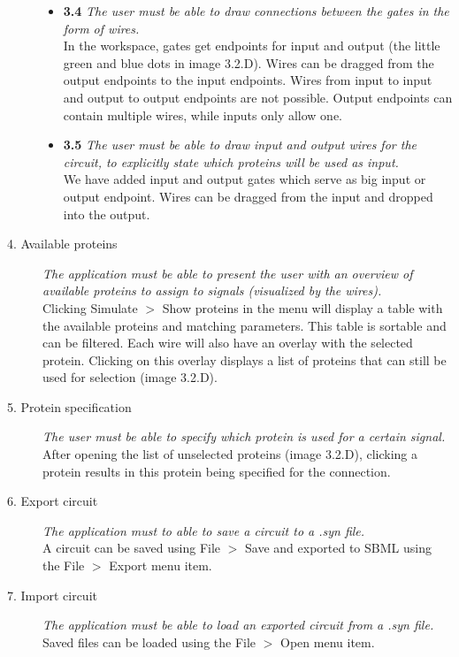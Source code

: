\documentclass[a4paper]{article}
\begin{document}
\begin{description}
\begin{itemize}
	\item \textbf{3.4} \textit{The user must be able to draw connections between the gates in the form of wires.}\\
	In the workspace, gates get endpoints for input and output (the little green and blue dots in image 3.2.D). Wires can be dragged from the output endpoints to the input endpoints. Wires from input to input and output to output endpoints are not possible. Output endpoints can contain multiple wires, while inputs only allow one.

	\item \textbf{3.5} \textit{The user must be able to draw input and output wires for the circuit, to explicitly state which proteins will be used as input.}\\
	We have added input and output gates which serve as big input or output endpoint. Wires can be dragged from the input and dropped into the output.

	\end{itemize}
\item[4. Available proteins] \textit{The application must be able to present the user with an overview of available proteins to assign to signals (visualized by the wires).}\\
Clicking Simulate $>$ Show proteins in the menu will display a table with the available proteins and matching parameters. This table is sortable and can be filtered. Each wire will also have an overlay with the selected protein. Clicking on this overlay displays a list of proteins that can still be used for selection (image 3.2.D).

\item[5. Protein specification] \textit{The user must be able to specify which protein is used for a certain signal.}\\
After opening the list of unselected proteins (image 3.2.D), clicking a protein results in this protein being specified for the connection.

\item[6. Export circuit] \textit{The application must to able to save a circuit to a .syn file.}\\
A circuit can be saved using File $>$ Save and exported to SBML using the File $>$ Export menu item.

\item[7. Import circuit] \textit{The application must be able to load an exported circuit from a .syn file.}\\
Saved files can be loaded using the File $>$ Open menu item.


\end{description}
\end{document}
